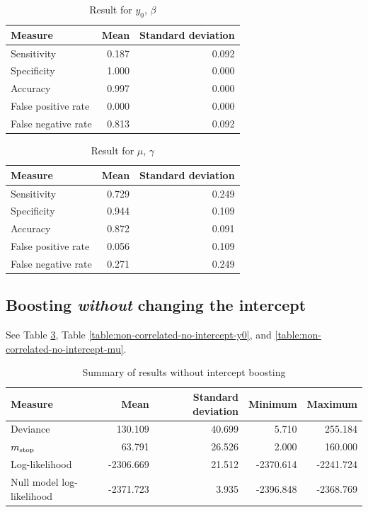 \begin{table}\caption{Result for $y_0$, $\beta$}\label{table:non-correlated-with-intercept-y0}
\begin{tabular}{l|rr}
Measure &  Mean &    Standard deviation \\
\hline
Sensitivity & 0.187 & 0.092 \\
Specificity & 1.000 & 0.000 \\
Accuracy    & 0.997 & 0.000 \\
False positive rate & 0.000 & 0.000 \\
False negative rate & 0.813 & 0.092
\end{tabular}
\end{table}


\begin{table}\caption{Result for $\mu$, $\gamma$}\label{table:non-correlated-with-intercept-mu}
\begin{tabular}{l|rr}
Measure     & Mean   & Standard deviation     \\
\hline
Sensitivity & 0.729 & 0.249 \\
Specificity & 0.944 & 0.109 \\
Accuracy    & 0.872 & 0.091 \\
False positive rate         & 0.056 & 0.109 \\
False negative rate         & 0.271 & 0.249
\end{tabular}
\end{table}



\subsection{Boosting \textit{without} changing the intercept}
See Table \ref{table:non-correlated-no-intercept-summary}, Table \ref{table:non-correlated-no-intercept-y0}, and \ref{table:non-correlated-no-intercept-mu}.
\begin{table}\caption{Summary of results without intercept boosting}\label{table:non-correlated-no-intercept-summary}
\begin{tabular}{l|rrrr}
Measure &    Mean &     Standard deviation &  Minimum & Maximum \\
\hline
Deviance    &   130.109 & 40.699 &     5.710 &   255.184 \\
$m_{\text{stop}}$      &    63.791 & 26.526 &     2.000 &   160.000 \\
Log-likelihood      & -2306.669 & 21.512 & -2370.614 & -2241.724 \\
Null model log-likelihood & -2371.723 &  3.935 & -2396.848 & -2368.769
\end{tabular}
\end{table}

